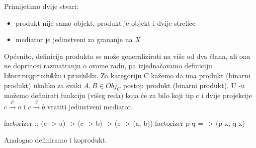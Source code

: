   
  \noindent Primijetimo dvije stvari:
  \begin{itemize}
    \item produkt nije samo objekt, produkt je objekt i dvije strelice
    \item mediator je jedinstveni za grananje na $X$
  \end{itemize}
  
  Općenito, definicija produkta se može generalizirati na više od dva člana, ali ona ne
  doprinosi razmatranju o ovome radu, pa izjednačavamo definiciju $\mathbb{binarnog produkta}$ i
  $\mathbb{produkta}$. Za kategoriju C kažemo da ima produkt (binarni produkt) ukoliko
  za svaki $A, B \in Obj_C$ postoji produkt (binarni produkt).
  U -u možemo definirati funkciju (višeg reda)
   koja će za bilo koji tip c i dvije projekcije $c
  \xrightarrow{p} a$ i $c \xrightarrow{q} b$ vratiti jedinstveni mediator.
  \begin{mcode}
    factorizer :: (c -> a) -> (c -> b) -> (c -> (a, b))
    factorizer p q = \x -> (p x, q x)
  \end{mcode}
  Analogno definiramo i koprodukt.\\

